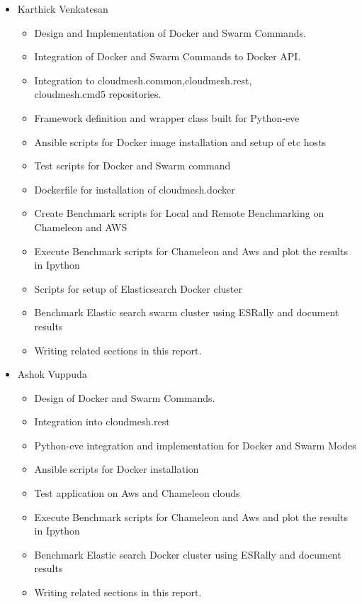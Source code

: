 \documentclass[9pt,twocolumn,twoside]{../../styles/osajnl}
\begin{document}
\begin{itemize}
\item Karthick Venkatesan
    \begin{itemize}
    \item Design and Implementation of Docker and Swarm Commands.
    \item Integration of Docker and Swarm Commands to Docker API.
    \item Integration to cloudmesh.common,cloudmesh.rest,\\
cloudmesh.cmd5 repositories.
    \item Framework definition and wrapper class built for Python-eve
    \item Ansible scripts for Docker image installation  and setup of etc hosts
    \item Test scripts for Docker and Swarm command
    \item Dockerfile for installation of cloudmesh.docker
    \item Create Benchmark scripts for Local and Remote Benchmarking on Chameleon and AWS
    \item Execute Benchmark scripts for Chameleon and Aws and plot the results in Ipython
    \item Scripts for setup of Elasticsearch Docker cluster
    \item Benchmark Elastic search swarm  cluster using ESRally and document results
    \item Writing related sections in this report.
    \end{itemize}

\item Ashok Vuppuda
    \begin{itemize}
    \item Design of Docker and Swarm Commands.
    \item Integration into cloudmesh.rest
    \item Python-eve integration and implementation for Docker and Swarm Modes
    \item Ansible scripts for Docker installation
    \item Test application on Aws and Chameleon clouds
    \item Execute Benchmark scripts for Chameleon and Aws and plot the results in Ipython
    \item Benchmark Elastic search Docker  cluster using ESRally and document results
    \item Writing related sections in this report.
    \end{itemize}
\end{itemize}





 


\newpage

\appendix
\end{document}
